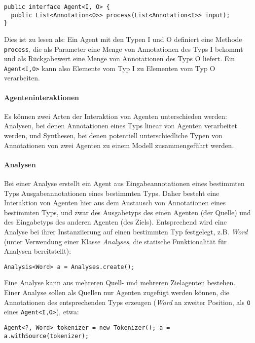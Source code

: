 \documentclass[abstracton, 12pt]{scrartcl}
\begin{document}
\begin{lstlisting}
public interface Agent<I, O> {
  public List<Annotation<O>> process(List<Annotation<I>> input);
}
\end{lstlisting}

Dies ist zu lesen als: Ein Agent mit den Typen I und O definiert eine Methode \lstinline!process!, die als Parameter eine Menge von Annotationen des Typs I bekommt und als Rückgabewert eine Menge von Annotationen des Typs O liefert. Ein  \lstinline!Agent<I,O>! kann also Elemente vom Typ I zu Elementen vom Typ O verarbeiten.

\paragraph{Agenteninteraktionen} \label{agent-interaction}

Es können zwei Arten der Interaktion von Agenten unterschieden werden: Analysen, bei denen Annotationen eines Typs linear von Agenten verarbeitet werden, und Synthesen, bei denen potentiell unterschiedliche Typen von Annotationen von zwei Agenten zu einem Modell zusammengeführt werden.

\paragraph{Analysen}

Bei einer Analyse erstellt ein Agent aus Eingabeannotationen eines bestimmten Typs Ausgabeannotationen eines bestimmten Typs. Daher besteht eine Interaktion von Agenten hier aus dem Austausch von Annotationen eines bestimmten Typs, und zwar des Ausgabetyps des einen Agenten (der Quelle) und des Eingabetyps des anderen Agenten (des Ziels). Entsprechend wird eine Analyse bei ihrer Instanziierung auf einen bestimmten Typ festgelegt, z.B. \emph{Word} (unter Verwendung einer Klasse \emph{Analyses}, die statische Funktionalität für Analysen bereitstellt):

\begin{lstlisting}
Analysis<Word> a = Analyses.create();
\end{lstlisting}

Eine Analyse kann aus mehreren Quell- und mehreren Zielagenten bestehen. Einer Analyse sollen als Quellen nur Agenten zugefügt werden können, die Annotationen des entsprechenden Typs erzeugen (\emph{Word} an zweiter Position, als \lstinline!O! eines \lstinline!Agent<I,O>!), etwa: 

\begin{lstlisting}
Agent<?, Word> tokenizer = new Tokenizer(); a = a.withSource(tokenizer);
\end{lstlisting}
\end{document}
